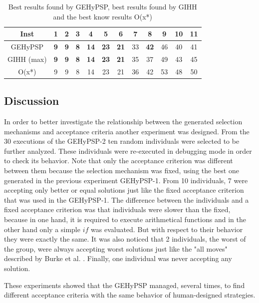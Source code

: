\documentclass[conference]{IEEEtran}
\begin{document}
\begin{table}[]
	\centering
	\caption{Best results found by GEHyPSP, best results found by GIHH and the best know results O(x*)}
	\label{tab:gihhandbhlh}
	\begin{tabular}{cccccccccccc}
		Inst         & 1 & 2 & 3 & 4  & 5  & 6  & 7  & 8  & 9  & 10 & 11 \\ \hline
		GEHyPSP  & \textbf{9} & \textbf{9} & \textbf{8} & \textbf{14} & \textbf{23} & \textbf{21} & 33 & \textbf{42} & 46 & 40 & 41 \\ \hline
		GIHH (max)   & \textbf{9} & \textbf{9} & \textbf{8} & \textbf{14} & \textbf{23} & \textbf{21} & 35 & 37 & 49 & 43 & 45 \\ \hline
		O(x*)        & 9 & 9 & 8 & 14 & 23 & 21 & 36 & 42 & 53 & 48 & 50
	\end{tabular}
\end{table}


\subsection{Discussion}

In order to better investigate the relationship between the generated selection mechanisms and acceptance criteria another experiment was designed. From the 30 executions of the GEHyPSP-2 ten random individuals were selected to be further analyzed. These individuals were re-executed in debugging mode in order to check its behavior. Note that only the acceptance criterion was different between them because the selection mechanism was fixed, using the best one generated in the previous experiment GEHyPSP-1. From 10 individuals, 7 were accepting only better or equal solutions just like the fixed acceptance criterion that was used in the GEHyPSP-1. The difference between the individuals and a fixed acceptance criterion was that individuals were slower than the fixed, because in one hand, it is required to execute arithmetical functions and in the other hand only a simple $if$ was evaluated. But with respect to their behavior they were exactly the same. It was also noticed that 2 individuals, the worst of the group, were always accepting worst solutions just like the "all moves" described by Burke et al. \cite{burke2013hyper}. Finally, one individual was never accepting any solution. 

These experiments showed that the GEHyPSP managed, several times, to find different acceptance criteria with the same behavior of human-designed strategies. 
\end{document}
